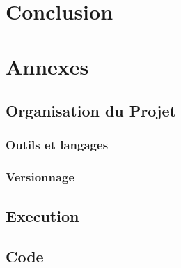\documentclass[11pt]{report}
\begin{document}
\chapter{Conclusion}
\newpage
\chapter{Annexes}
\section{Organisation du Projet}
\subsection{Outils et langages} 
\subsection{Versionnage} 
\newpage
\section{Execution}
\newpage
\section{Code}
\end{document}
